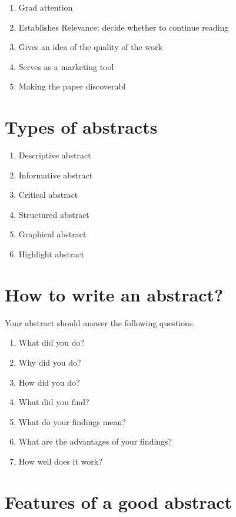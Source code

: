 \documentclass[
  letterpaper,
  DIV=11,
  numbers=noendperiod]{scrreprt}
\begin{document}
\begin{enumerate}
\def\labelenumi{\arabic{enumi}.}
\item
  Grad attention
\item
  Establishes Relevance: decide whether to continue reading
\item
  Gives an idea of the quality of the work
\item
  Serves as a marketing tool
\item
  Making the paper discoverabl
\end{enumerate}

\section{Types of abstracts}\label{types-of-abstracts}

\begin{enumerate}
\def\labelenumi{\arabic{enumi}.}
\item
  Descriptive abstract
\item
  Informative abstract
\item
  Critical abstract
\item
  Structured abstract
\item
  Graphical abstract
\item
  Highlight abstract
\end{enumerate}

\section{How to write an abstract?}\label{how-to-write-an-abstract}

Your abstract should answer the following questions.

\begin{enumerate}
\def\labelenumi{\arabic{enumi}.}
\item
  What did you do?
\item
  Why did you do?
\item
  How did you do?
\item
  What did you find?
\item
  What do your findings mean?
\item
  What are the advantages of your findings?
\item
  How well does it work?
\end{enumerate}

\section{Features of a good abstract}\label{features-of-a-good-abstract}
\end{document}
